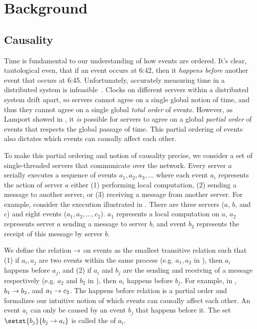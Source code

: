 \newcommand{\ttt}[1]{\texttt{#1}}
\newcommand{\Why}[1]{\textsf{Why}(#1)}

\section{Background}

\subsection{Causality}
Time is fundamental to our understanding of how events are ordered. It's clear,
tautological even, that if an event occurs at 6:42, then it \emph{happens
before} another event that occurs at 6:45. Unfortunately, accurately measuring
time in a distributed system is infeasible~\cite{marzullo1984maintaining,
sampath2012synchronization, schmid2000orthogonal}. Clocks on different servers
within a distributed system drift apart, so servers cannot agree on a single
global notion of time, and thus they cannot agree on a single global
\emph{total order} of events. However, as Lamport showed in
\cite{lamport1978time}, it \emph{is} possible for servers to agree on a global
\emph{partial order} of events that respects the global passage of time. This
partial ordering of events also dictates which events can causally affect each
other.

To make this partial ordering and notion of causality precise, we consider a
set of single-threaded servers that communicate over the network. Every server
$a$ serially executes a sequence of events $a_1, a_2, a_3, \ldots$ where each
event $a_i$ represents the action of server $a$ either (1) performing local
computation, (2) sending a message to another server, or (3) receiving a
message from another server. For example, consider the execution illustrated in
. There are three servers ($a$, $b$, and $c$) and eight
events ($a_1, a_2, \ldots, c_2$).  $a_1$ represents a local computation on $a$,
$a_2$ represents server $a$ sending a message to server $b$, and event $b_2$
represents the receipt of this message by server $b$.

{}

We define the  relation $\to$ on events as
the smallest transitive relation such that
%
(1)
  if $a_i, a_j$ are two events within the same process (e.g. $a_1, a_2$ in
  ), then $a_i$ happens before $a_j$, and
(2)
  if $a_i$ and $b_j$ are the sending and receiving of a message respectively
  (e.g. $a_2$ and $b_2$ in ), then $a_i$ happens before
  $b_j$.
%
For example, in , $b_1 \to b_2$, and $a_1
\to c_2$. The happens before relation is a partial order and
formalizes our intuitive notion of which events can causally affect each other.
An event $a_i$ can only be caused by an event $b_j$ that happens before it.
The set $\setst{b_j}{b_j \happensbefore a_i}$ is called the  of $a_i$.

